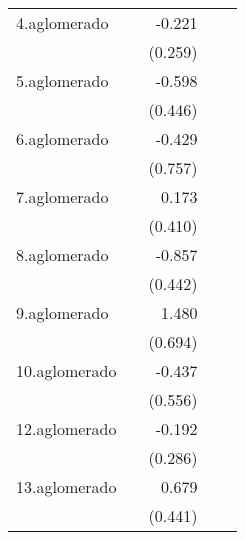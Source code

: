 {\begin{longtable}{l*{4}{D{.}{.}{-1}}}
\addlinespace
4.aglomerado&                     &      -0.221         &                     &                     \\
            &                     &     (0.259)         &                     &                     \\
\addlinespace
5.aglomerado&                     &      -0.598         &                     &                     \\
            &                     &     (0.446)         &                     &                     \\
\addlinespace
6.aglomerado&                     &      -0.429         &                     &                     \\
            &                     &     (0.757)         &                     &                     \\
\addlinespace
7.aglomerado&                     &       0.173         &                     &                     \\
            &                     &     (0.410)         &                     &                     \\
\addlinespace
8.aglomerado&                     &      -0.857         &                     &                     \\
            &                     &     (0.442)         &                     &                     \\
\addlinespace
9.aglomerado&                     &       1.480\sym{*}  &                     &                     \\
            &                     &     (0.694)         &                     &                     \\
\addlinespace
10.aglomerado&                     &      -0.437         &                     &                     \\
            &                     &     (0.556)         &                     &                     \\
\addlinespace
12.aglomerado&                     &      -0.192         &                     &                     \\
            &                     &     (0.286)         &                     &                     \\
\addlinespace
13.aglomerado&                     &       0.679         &                     &                     \\
            &                     &     (0.441)         &                     &                     \\

\end{longtable}}
